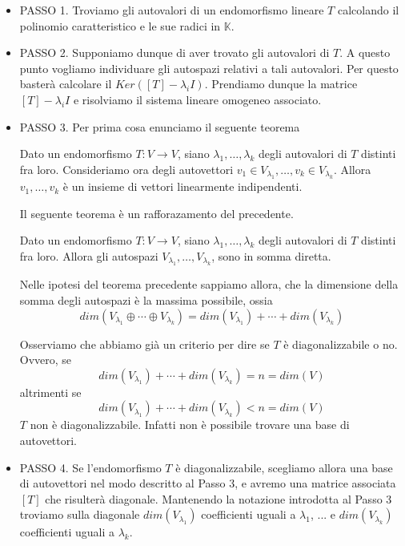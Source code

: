 \begin{itemize}
	\item PASSO 1. Troviamo gli autovalori di un endomorfismo lineare $T$ calcolando il polinomio
	      caratteristico e le sue radici in $\mathbb{K}$.
	\item PASSO 2. Supponiamo dunque di aver trovato gli autovalori di $T$. A questo punto
	      vogliamo individuare gli autospazi relativi a tali autovalori.
	      Per questo baster\`a calcolare il $Ker([T] - \lambda_i I)$. Prendiamo dunque la
	      matrice $[T] - \lambda_i I$ e risolviamo il sistema lineare omogeneo associato.
	\item PASSO 3. Per prima cosa enunciamo il seguente teorema
	      \begin{theorem}
		      Dato un endomorfismo $T : V \to V$, siano $\lambda_1, \dots, \lambda_k$
		      degli autovalori di $T$ distinti fra loro. Consideriamo ora degli autovettori
		      $v_1 \in V_{\lambda_1}, \dots, v_k \in V_{\lambda_k}$. Allora
		      $v_1, \dots, v_k$ \`e un insieme di vettori linearmente indipendenti.
	      \end{theorem}

	      Il seguente teorema \`e un rafforazamento del precedente.
	      \begin{theorem}
		      Dato un endomorfismo $T : V \to V$, siano $\lambda_1, \dots, \lambda_k$ degli
		      autovalori di $T$ distinti fra loro. Allora gli autospazi
		      $V_{\lambda_1}, \dots, V_{\lambda_k}$, sono in somma diretta.
	      \end{theorem}

	      Nelle ipotesi del teorema precedente sappiamo allora, che la dimensione della somma
	      degli autospazi \`e la massima possibile, ossia
	      \begin{equation*}
		      dim(V_{\lambda_1} \oplus \cdots \oplus V_{\lambda_k}) = dim(V_{\lambda_1}) +
		      \cdots + dim(V_{\lambda_k})
	      \end{equation*}

	      Osserviamo che abbiamo gi\`a un criterio per dire se $T$ \`e diagonalizzabile o no.
	      Ovvero, se
	      \begin{equation*}
		      dim(V_{\lambda_1}) + \cdots + dim(V_{\lambda_k}) = n = dim(V)
	      \end{equation*}
	      altrimenti se
	      \begin{equation*}
		      dim(V_{\lambda_1}) + \cdots + dim(V_{\lambda_k}) < n = dim(V)
	      \end{equation*}
	      $T$ non \`e diagonalizzabile. Infatti non \`e possibile trovare una base di
	      autovettori.
	\item PASSO 4. Se l'endomorfismo $T$ \`e diagonalizzabile, scegliamo allora una base di
	      autovettori nel modo descritto al Passo 3, e avremo una matrice associata $[T]$ che
	      risulter\`a diagonale. Mantenendo la notazione introdotta al Passo 3 troviamo sulla
	      diagonale $dim(V_{\lambda_1})$ coefficienti uguali a
	      $\lambda_1$, ... e $dim(V_{\lambda_k})$ coefficienti uguali a $\lambda_k$.
\end{itemize}
